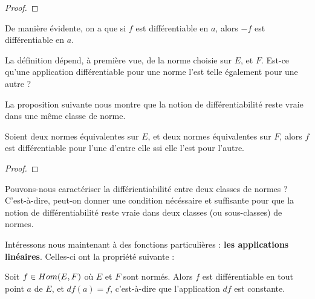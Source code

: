 \begin{proof}
	
\end{proof}

De manière évidente, on a que si $f$ est différentiable en $a$, alors $-f$ est
différentiable en $a$.

La définition dépend, à première vue, de la norme choisie sur $E$, et $F$. Est-ce
qu'une application différentiable pour une norme l'est telle également pour une
autre ?

La proposition suivante nous montre que la notion de différentiabilité reste
vraie dans une même classe de norme.

\begin{proposition}
	Soient deux normes équivalentes sur $E$, et deux normes équivalentes sur
	$F$, alors $f$ est différentiable pour l'une d'entre elle ssi elle l'est
	pour l'autre.
\end{proposition}

\begin{proof}
	
\end{proof}

\begin{question}
	Pouvons-nous caractériser la différientiabilité entre deux classes de normes
	? C'est-à-dire, peut-on donner une condition nécéssaire et suffisante pour
	que la notion de différentiabilité reste vraie dans deux classes (ou
	sous-classes) de normes.
\end{question}



Intéressons nous maintenant à des fonctions particulières : \textbf{les applications
linéaires}.
Celles-ci ont la propriété suivante :

\begin{proposition}
	Soit $f \in Hom(E, F)$ où $E$ et $F$ sont normés. Alors $f$ est
	différentiable en tout point $a$ de $E$, et $df(a) = f$, c'est-à-dire que
	l'application $df$ est constante.
\end{proposition}

